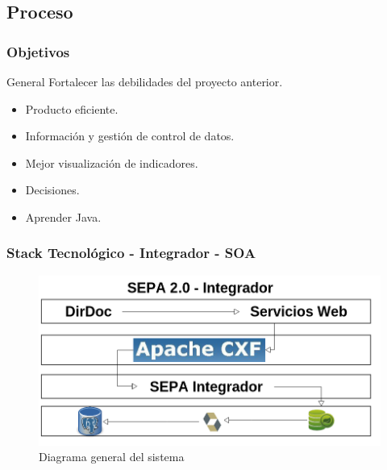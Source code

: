 \documentclass{beamer}
\begin{document}

\subsection{Proceso}

\begin{frame}
\frametitle{Objetivos}
\begin{block}{General}
Fortalecer las debilidades del proyecto anterior.
\end{block}

\begin{itemize}
\item Producto eficiente.
\item Información y gestión de control de datos.
\item Mejor visualización de indicadores.
\item Decisiones.
\item Aprender Java.
\end{itemize}
\end{frame}



\begin{frame}
\frametitle{Stack Tecnológico - Integrador - SOA}
\begin{figure}[!hbp]
\begin{center}
\includegraphics[scale=0.3,angle=0]{images/sepa_soa.png}
\caption{Diagrama general del sistema}
\label{Diagrama general del sistema}
\end{center}
\end{figure}
\end{frame}

\end{document}
